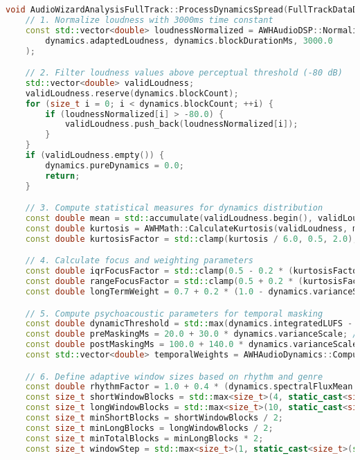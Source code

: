 \documentclass[11pt]{article}
\begin{document}
\begin{lstlisting}[language=C++]
void AudioWizardAnalysisFullTrack::ProcessDynamicsSpread(FullTrackDataDynamics& dynamics) {
	// 1. Normalize loudness with 3000ms time constant
	const std::vector<double> loudnessNormalized = AWHAudioDSP::NormalizeLoudness(
		dynamics.adaptedLoudness, dynamics.blockDurationMs, 3000.0
	);

	// 2. Filter loudness values above perceptual threshold (-80 dB)
	std::vector<double> validLoudness;
	validLoudness.reserve(dynamics.blockCount);
	for (size_t i = 0; i < dynamics.blockCount; ++i) {
		if (loudnessNormalized[i] > -80.0) {
			validLoudness.push_back(loudnessNormalized[i]);
		}
	}
	if (validLoudness.empty()) {
		dynamics.pureDynamics = 0.0;
		return;
	}

	// 3. Compute statistical measures for dynamics distribution
	const double mean = std::accumulate(validLoudness.begin(), validLoudness.end(), 0.0) / validLoudness.size();
	const double kurtosis = AWHMath::CalculateKurtosis(validLoudness, mean, dynamics.integratedLUFS);
	const double kurtosisFactor = std::clamp(kurtosis / 6.0, 0.5, 2.0);

	// 4. Calculate focus and weighting parameters
	const double iqrFocusFactor = std::clamp(0.5 - 0.2 * (kurtosisFactor - 1.0), 0.4, 0.8);
	const double rangeFocusFactor = std::clamp(0.5 + 0.2 * (kurtosisFactor - 1.0), 0.4, 0.8);
	const double longTermWeight = 0.7 + 0.2 * (1.0 - dynamics.varianceScale) * kurtosisFactor;

	// 5. Compute psychoacoustic parameters for temporal masking
	const double dynamicThreshold = std::max(dynamics.integratedLUFS - 22.0 + 4.0 * dynamics.genreFactor, -80.0);
	const double preMaskingMs = 20.0 + 30.0 * dynamics.varianceScale; // 20–50 ms
	const double postMaskingMs = 100.0 + 140.0 * dynamics.varianceScale; // 100–240 ms
	const std::vector<double> temporalWeights = AWHAudioDynamics::ComputeTemporalWeights(loudnessNormalized, dynamics.blockDurationMs, preMaskingMs, postMaskingMs, dynamics.variance);

	// 6. Define adaptive window sizes based on rhythm and genre
	const double rhythmFactor = 1.0 + 0.4 * (dynamics.spectralFluxMean / 0.15) * dynamics.genreFactor;
	const size_t shortWindowBlocks = std::max<size_t>(4, static_cast<size_t>(std::round((150.0 + 650.0 * dynamics.genreFactor) / dynamics.blockDurationMs * rhythmFactor)));
	const size_t longWindowBlocks = std::max<size_t>(10, static_cast<size_t>(std::round((1500.0 + 3000.0 * dynamics.genreFactor) / dynamics.blockDurationMs * rhythmFactor)));
	const size_t minShortBlocks = shortWindowBlocks / 2;
	const size_t minLongBlocks = longWindowBlocks / 2;
	const size_t minTotalBlocks = minLongBlocks * 2;
	const size_t windowStep = std::max<size_t>(1, static_cast<size_t>(std::round(longWindowBlocks / 4.0)));


\end{lstlisting}
\end{document}
